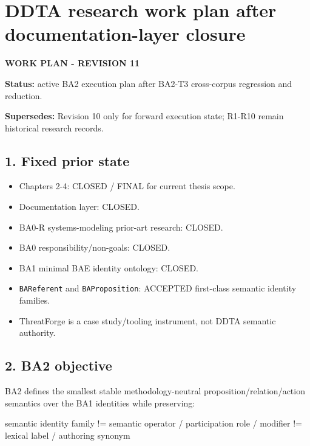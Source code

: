 \documentclass[
  10pt,
  a4paper,
]{article}
\author{}
\date{}
\newenvironment{Shaded}{}{}
\newcommand{\NormalTok}[1]{#1}
\providecommand{\tightlist}{%
  \setlength{\itemsep}{0pt}\setlength{\parskip}{0pt}}
\begin{document}
\section{DDTA research work plan after documentation-layer
closure}\label{ddta-research-work-plan-after-documentation-layer-closure}

\textbf{WORK PLAN - REVISION 11}

\textbf{Status:} active BA2 execution plan after BA2-T3 cross-corpus
regression and reduction.

\textbf{Supersedes:} Revision 10 only for forward execution state;
R1-R10 remain historical research records.

\subsection{1. Fixed prior state}\label{1-fixed-prior-state}

\begin{itemize}
\tightlist
\item
  Chapters 2-4: CLOSED / FINAL for current thesis scope.
\item
  Documentation layer: CLOSED.
\item
  BA0-R systems-modeling prior-art research: CLOSED.
\item
  BA0 responsibility/non-goals: CLOSED.
\item
  BA1 minimal BAE identity ontology: CLOSED.
\item
  \texttt{BAReferent} and \texttt{BAProposition}: ACCEPTED first-class
  semantic identity families.
\item
  ThreatForge is a case study/tooling instrument, not DDTA semantic
  authority.
\end{itemize}

\subsection{2. BA2 objective}\label{2-ba2-objective}

BA2 defines the smallest stable methodology-neutral
proposition/relation/action semantics over the BA1 identities while
preserving:

\begin{Shaded}
\begin{Highlighting}[]
\NormalTok{semantic identity family}
\NormalTok{    !=}
\NormalTok{semantic operator / participation role / modifier}
\NormalTok{    !=}
\NormalTok{lexical label / authoring synonym}
\end{Highlighting}
\end{Shaded}
\end{document}
